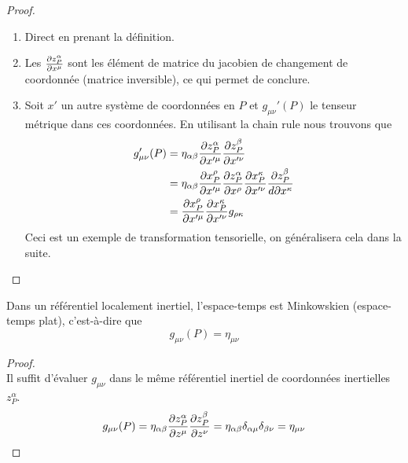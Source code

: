 \documentclass[a4paper,11pt]{report}
\begin{document}
            \begin{proof}
                \begin{enumerate}[label = \textit{\roman*)}]
                    \item Direct en prenant la définition.
                    \item Les $\frac{\partial z^\alpha_P}{\partial x^\mu}$ sont les élément de matrice du jacobien de changement de coordonnée (matrice inversible), ce qui permet de conclure.
                    \item Soit $x'$ un autre système de coordonnées en $P$ et $g_{\mu\nu}'(P)$ le tenseur métrique dans ces coordonnées. En utilisant la chain rule nous trouvons que
                    \begin{align}
                        g_{\mu\nu}'(P) &= \eta_{\alpha\beta}\frac{\partial z^\alpha_P}{ \partial x'^\mu}\frac{\partial z^\beta_P}{\partial x'^\nu}\\
                        &= \eta_{\alpha\beta}\frac{\partial x^\rho_P}{ \partial x'^\mu}\frac{\partial z^\alpha_P}{\partial x^\rho}\frac{\partial x^\kappa_P}{ \partial x'^\nu}\frac{\partial z^\beta_P}{d\partial x^\kappa} \\
                        &= \frac{\partial x^\rho_P}{ \partial x'^\mu}\frac{\partial x^\kappa_P}{ \partial x'^\nu}g_{\rho\kappa}
                    \end{align}
                    Ceci est un exemple de transformation tensorielle, on généralisera cela dans la suite.
                \end{enumerate}
            \end{proof}
            
            \begin{prop}\begin{leftbar}
                Dans un référentiel localement inertiel, l'espace-temps est Minkowskien (espace-temps plat), c'est-à-dire que
                \begin{equation}
                    g_{\mu\nu}(P) = \eta_{\mu\nu}
                \end{equation}
            \end{leftbar}\end{prop}
            
            \begin{proof}
            ${}$\\
                Il suffit d'évaluer $g_{\mu\nu}$ dans le même référentiel inertiel de coordonnées inertielles $z^\alpha_P$.
                \begin{equation}
                    g_{\mu\nu}(P) = \eta_{\alpha\beta}\frac{\partial z^\alpha_P}{ \partial z^\mu}\frac{\partial z^\beta_P}{\partial z^\nu} =  \eta_{\alpha\beta}\delta_{\alpha\mu}\delta_{\beta\nu} = \eta_{\mu\nu}
                \end{equation}
            \end{proof}
            
\end{document}
